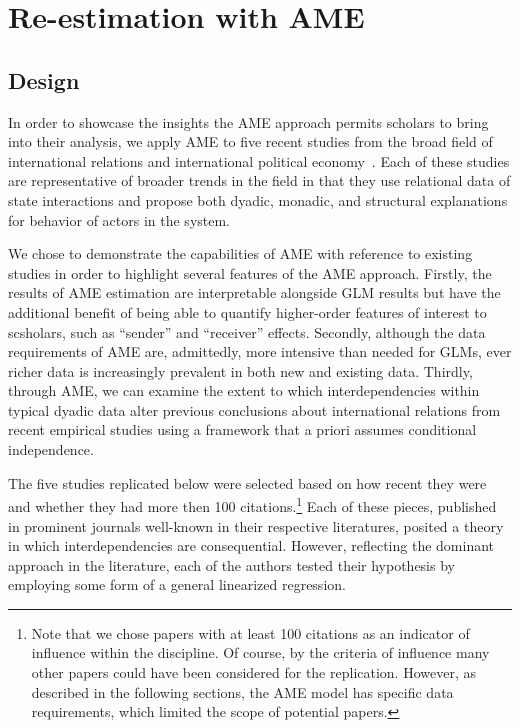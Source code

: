 \documentclass{article}[12pt]
\begin{document}
\section{\textbf{Re-estimation with AME}}
 

\subsection{Design}

In order to showcase the insights the AME approach permits scholars to
bring into their analysis, we apply AME to five recent studies from the broad field of international relations
and international political economy~\citep{reiter:stam:2003, mcdonald:2004,  rose:2004, weeks:2012,
  gibler:2017}. Each of these studies are representative of broader trends in the field in that they use
relational data of state interactions and propose both dyadic,
monadic, and structural explanations for behavior of actors in the system. 

We chose to demonstrate the capabilities of AME with reference
to existing studies in order to highlight several features of the
AME approach. Firstly, the results of AME estimation are interpretable
alongside GLM results but have the additional benefit of being able to
quantify higher-order features of interest to scsholars, such as
``sender'' and ``receiver'' effects. Secondly, although the data
requirements of AME are, admittedly, more intensive than needed for GLMs, ever richer data
is increasingly prevalent in both new and existing data. Thirdly,
through AME, we can examine the extent to which interdependencies
within typical dyadic data alter previous conclusions about
international relations from recent empirical studies using a
framework that a priori assumes conditional independence.

The five studies replicated below were selected based on how recent they were and
whether they had more then 100 citations.\footnote{Note that we chose
  papers with at least 100 citations as an indicator of influence
  within the discipline. Of course, by the criteria of influence many
  other papers could have been considered for the
  replication. However, as described in the following sections, the
  AME model has specific data requirements, which limited the scope of
  potential papers.}  Each of these pieces, published in prominent
journals well-known in their respective literatures, posited a theory
in which interdependencies are consequential. However, reflecting the
dominant approach in the literature, each of the authors tested their
hypothesis by employing some form of a general linearized
regression. 
 
\end{document}
